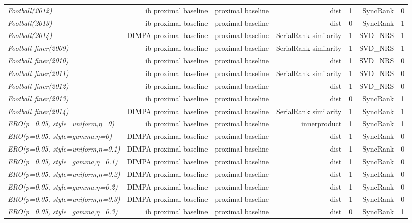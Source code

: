 \documentclass[nohyperref]{article}
\theoremstyle{plain}
\theoremstyle{definition}
\theoremstyle{remark}
\begin{document}
\begin{table*}[!ht]
{\begin{tabular}{lrrrrrr}
			{\it Football(2012)} & ib proximal baseline & proximal baseline & dist & 1 & SyncRank & 0 \\
			{\it Football(2013)} & ib proximal baseline & proximal baseline & dist & 0 & SyncRank & 1 \\
			{\it Football(2014)} & DIMPA proximal baseline & proximal baseline & SerialRank similarity & 1 & SVD\_NRS & 1 \\
			{\it Football finer(2009)} & ib proximal baseline & proximal baseline & SerialRank similarity & 1 & SVD\_NRS & 1 \\
			{\it Football finer(2010)} & ib proximal baseline & proximal baseline & dist & 1 & SVD\_NRS & 0 \\
			{\it Football finer(2011)} & ib proximal baseline & proximal baseline & SerialRank similarity & 1 & SVD\_NRS & 0 \\
			{\it Football finer(2012)} & ib proximal baseline & proximal baseline & dist & 1 & SVD\_NRS & 0 \\
			{\it Football finer(2013)} & ib proximal baseline & proximal baseline & dist & 0 & SyncRank & 1 \\
			{\it Football finer(2014)} & DIMPA proximal baseline & proximal baseline & SerialRank similarity & 1 & SyncRank & 1 \\
{\it ERO(p=0.05, style=uniform,$\eta$=0)} & ib proximal baseline & proximal baseline & innerproduct & 1 & SyncRank & 1 \\
			{\it ERO(p=0.05, style=gamma,$\eta$=0)} & DIMPA proximal baseline & proximal baseline & dist & 1 & SyncRank & 0 \\
			{\it ERO(p=0.05, style=uniform,$\eta$=0.1)} & DIMPA proximal baseline & proximal baseline & dist & 1 & SyncRank & 0 \\
			{\it ERO(p=0.05, style=gamma,$\eta$=0.1)} & DIMPA proximal baseline & proximal baseline & dist & 1 & SyncRank & 0 \\
			{\it ERO(p=0.05, style=uniform,$\eta$=0.2)} & DIMPA proximal baseline & proximal baseline & dist & 1 & SyncRank & 0 \\
			{\it ERO(p=0.05, style=gamma,$\eta$=0.2)} & DIMPA proximal baseline & proximal baseline & dist & 1 & SyncRank & 0 \\
			{\it ERO(p=0.05, style=uniform,$\eta$=0.3)} & DIMPA proximal baseline & proximal baseline & dist & 1 & SyncRank & 0 \\
			{\it ERO(p=0.05, style=gamma,$\eta$=0.3)} & ib proximal baseline & proximal baseline & dist & 0 & SyncRank & 1 \\

\end{tabular}}
\end{table*}
\end{document}
